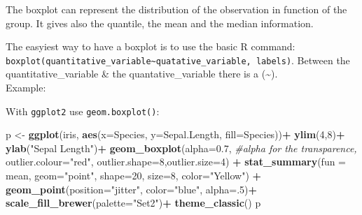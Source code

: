 \documentclass[
]{article}
\newenvironment{Shaded}{\begin{snugshade}}{\end{snugshade}}
\newcommand{\AttributeTok}[1]{\textcolor[rgb]{0.13,0.29,0.53}{#1}}
\newcommand{\CommentTok}[1]{\textcolor[rgb]{0.56,0.35,0.01}{\textit{#1}}}
\newcommand{\DecValTok}[1]{\textcolor[rgb]{0.00,0.00,0.81}{#1}}
\newcommand{\FloatTok}[1]{\textcolor[rgb]{0.00,0.00,0.81}{#1}}
\newcommand{\FunctionTok}[1]{\textcolor[rgb]{0.13,0.29,0.53}{\textbf{#1}}}
\newcommand{\NormalTok}[1]{#1}
\newcommand{\OtherTok}[1]{\textcolor[rgb]{0.56,0.35,0.01}{#1}}
\newcommand{\SpecialCharTok}[1]{\textcolor[rgb]{0.81,0.36,0.00}{\textbf{#1}}}
\newcommand{\StringTok}[1]{\textcolor[rgb]{0.31,0.60,0.02}{#1}}
\begin{document}
The boxplot can represent the distribution of the observation in
function of the group. It gives also the quantile, the mean and the
median information.

The easyiest way to have a boxplot is to use the basic R command:
\texttt{boxplot(quantitative\_variable\textasciitilde{}quatative\_variable,\ labels)}.
Between the quantitative\_variable \& the quantative\_variable there is
a (\textbf{\textasciitilde{}}).\\
Example:

\begin{Shaded}
\end{Shaded}

With \texttt{ggplot2} use \texttt{geom.boxplot()}:

\begin{Shaded}
\begin{Highlighting}[]
\NormalTok{p }\OtherTok{\textless{}{-}} \FunctionTok{ggplot}\NormalTok{(iris, }\FunctionTok{aes}\NormalTok{(}\AttributeTok{x=}\NormalTok{Species, }\AttributeTok{y=}\NormalTok{Sepal.Length, }\AttributeTok{fill=}\NormalTok{Species))}\SpecialCharTok{+}
  \FunctionTok{ylim}\NormalTok{(}\DecValTok{4}\NormalTok{,}\DecValTok{8}\NormalTok{)}\SpecialCharTok{+}
  \FunctionTok{ylab}\NormalTok{(}\StringTok{"Sepal Length"}\NormalTok{)}\SpecialCharTok{+} 
  \FunctionTok{geom\_boxplot}\NormalTok{(}\AttributeTok{alpha=}\FloatTok{0.7}\NormalTok{, }\CommentTok{\#alpha for the transparence,}
               \AttributeTok{outlier.colour=}\StringTok{"red"}\NormalTok{,}
               \AttributeTok{outlier.shape=}\DecValTok{8}\NormalTok{,}\AttributeTok{outlier.size=}\DecValTok{4}\NormalTok{) }\SpecialCharTok{+}
  \FunctionTok{stat\_summary}\NormalTok{(}\AttributeTok{fun =}\NormalTok{ mean, }\AttributeTok{geom=}\StringTok{"point"}\NormalTok{, }\AttributeTok{shape=}\DecValTok{20}\NormalTok{, }\AttributeTok{size=}\DecValTok{8}\NormalTok{, }\AttributeTok{color=}\StringTok{"Yellow"}\NormalTok{) }\SpecialCharTok{+}
  \FunctionTok{geom\_point}\NormalTok{(}\AttributeTok{position=}\StringTok{"jitter"}\NormalTok{, }\AttributeTok{color=}\StringTok{"blue"}\NormalTok{, }\AttributeTok{alpha=}\NormalTok{.}\DecValTok{5}\NormalTok{)}\SpecialCharTok{+}
  \FunctionTok{scale\_fill\_brewer}\NormalTok{(}\AttributeTok{palette=}\StringTok{"Set2"}\NormalTok{)}\SpecialCharTok{+}
  \FunctionTok{theme\_classic}\NormalTok{()}
\NormalTok{p}
\end{Highlighting}
\end{Shaded}
\end{document}
